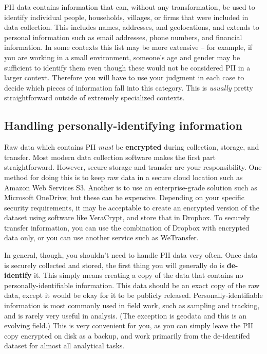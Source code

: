 PII data contains information that can, without any transformation, be used to identify
individual people, households, villages, or firms that were included in data collection.
This includes names, addresses, and geolocations, and extends to personal information
such as email addresses, phone numbers, and financial information.
In some contexts this list may be more extensive --
for example, if you are working in a small environment,
someone's age and gender may be sufficient to identify them
even though these would not be considered PII in a larger context.
Therefore you will have to use your judgment in each case
to decide which pieces of information fall into this category.
This is \textit{usually} pretty straightforward outside of extremely specialized contexts.

\subsection{Handling personally-identifying information}

Raw data which contains PII \textit{must} be \textbf{encrypted}
during collection, storage, and transfer.
Most modern data collection software makes the first part straightforward.
However, secure storage and transfer are your responsibility.
One method for doing this is to keep raw data in a secure cloud location such as Amazon Web Services S3.
Another is to use an enterprise-grade solution such as Microsoft OneDrive; but these can be expensive.
Depending on your specific security requirements,
it may be acceptable to create an encrypted version of the dataset
using software like VeraCrypt, and store that in Dropbox.
To securely transfer information,
you can use the combination of Dropbox with encrypted data only,
or you can use another service such as WeTransfer.

In general, though, you shouldn't need to handle PII data very often.
Once data is securely collected and stored, the first thing you will generally do is \textbf{de-identify} it.
This simply means creating a copy of the data that contains no personally-identifiable information.
This data should be an exact copy of the raw data,
except it would be okay for it to be publicly released.\cite{matthews2011data}
Personally-identifiable information is most commonly used in field work, such as sampling and tracking,
and is rarely very useful in analysis. (The exception is geodata and this is an evolving field.)
This is very convenient for you, as you can simply leave the PII copy encrypted on disk as a backup,
and work primarily from the de-identifed dataset for almost all analytical tasks.

